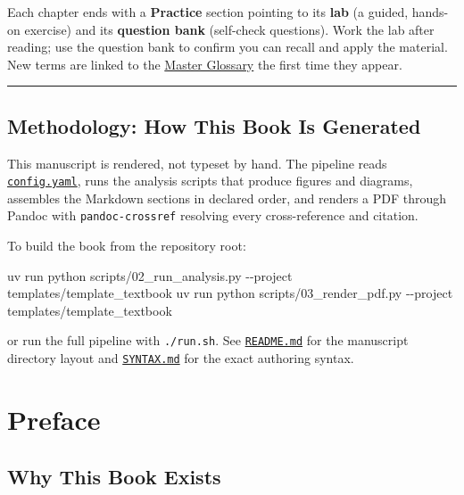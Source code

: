 \documentclass[
]{article}
\newenvironment{Shaded}{}{}
\newcommand{\AttributeTok}[1]{\textcolor[rgb]{0.49,0.56,0.16}{#1}}
\newcommand{\ExtensionTok}[1]{#1}
\newcommand{\NormalTok}[1]{#1}
\theoremstyle{plain}
\theoremstyle{definition}
\begin{document}
Each chapter ends with a \textbf{Practice} section pointing to its
\textbf{lab} (a guided, hands-on exercise) and its \textbf{question
bank} (self-check questions). Work the lab after reading; use the
question bank to confirm you can recall and apply the material. New
terms are linked to the \href{glossary.md}{Master Glossary} the first
time they appear.

\begin{center}\rule{0.5\linewidth}{0.5pt}\end{center}

\subsection{Methodology: How This Book Is
Generated}\label{methodology-how-this-book-is-generated}

This manuscript is rendered, not typeset by hand. The pipeline reads
\href{config.yaml}{\texttt{config.yaml}}, runs the analysis scripts that
produce figures and diagrams, assembles the Markdown sections in
declared order, and renders a PDF through Pandoc with
\texttt{pandoc-crossref} resolving every cross-reference and citation.

To build the book from the repository root:

\begin{Shaded}
\begin{Highlighting}[]
\ExtensionTok{uv}\NormalTok{ run python scripts/02\_run\_analysis.py }\AttributeTok{{-}{-}project}\NormalTok{ templates/template\_textbook}
\ExtensionTok{uv}\NormalTok{ run python scripts/03\_render\_pdf.py    }\AttributeTok{{-}{-}project}\NormalTok{ templates/template\_textbook}
\end{Highlighting}
\end{Shaded}

or run the full pipeline with \texttt{./run.sh}. See
\href{README.md}{\texttt{README.md}} for the manuscript directory layout
and \href{SYNTAX.md}{\texttt{SYNTAX.md}} for the exact authoring syntax.

\newpage

\section{Preface}\label{preface}

\subsection{Why This Book Exists}\label{why-this-book-exists}
\end{document}
